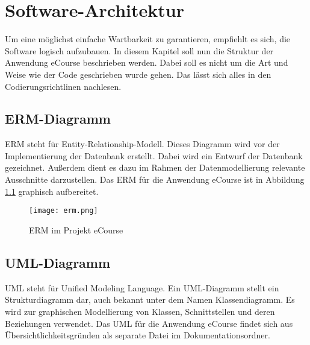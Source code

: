 \chapter{Software-Architektur}

Um eine möglichst einfache Wartbarkeit zu garantieren, empfiehlt es sich, die Software logisch aufzubauen. In diesem Kapitel soll nun die Struktur der Anwendung eCourse beschrieben werden. Dabei soll es nicht um die Art und Weise wie der Code geschrieben wurde gehen. Das lässt sich alles in den Codierungsrichtlinen nachlesen.

\section{ERM-Diagramm}
ERM steht für Entity-Relationship-Modell. Dieses Diagramm wird vor der Implementierung der Datenbank erstellt. Dabei wird ein Entwurf der Datenbank gezeichnet. Außerdem dient es dazu im Rahmen der Datenmodellierung relevante Ausschnitte darzustellen. Das ERM für die Anwendung eCourse ist in Abbildung \ref{fib:erm} graphisch aufbereitet.

\begin{figure}[H]
\centering
\texttt{[image: erm.png]}
\caption{ERM im Projekt eCourse}
\label{fib:erm}
\end{figure}

\section{UML-Diagramm}
UML steht für Unified Modeling Language. Ein UML-Diagramm stellt ein Strukturdiagramm dar, auch bekannt unter dem Namen Klassendiagramm. Es wird zur graphischen Modellierung von Klassen, Schnittstellen und deren Beziehungen verwendet. \newline
Das UML für die Anwendung eCourse findet sich aus Übersichtlichkeitsgründen als separate Datei im Dokumentationsordner.